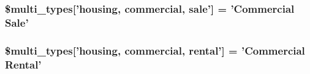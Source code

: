 \label{db/d70/property__parts_8php_a13fb2935c84b64bd46b19bd98d2449e7}
\hypertarget{property__parts_8php_a217608fa0ac106b169a30dad1465a854}{
\subsubsection[{\$multi\_\-types}]{\setlength{\rightskip}{0pt plus 5cm}\$multi\_\-types\mbox{[}'housing, commercial, sale'\mbox{]} = 'Commercial Sale'}}
\label{db/d70/property__parts_8php_a217608fa0ac106b169a30dad1465a854}
\hypertarget{property__parts_8php_a7d06c706405f05fda8e18bcba6326a3c}{
\subsubsection[{\$multi\_\-types}]{\setlength{\rightskip}{0pt plus 5cm}\$multi\_\-types\mbox{[}'housing, commercial, rental'\mbox{]} = 'Commercial Rental'}}
\label{db/d70/property__parts_8php_a7d06c706405f05fda8e18bcba6326a3c}
